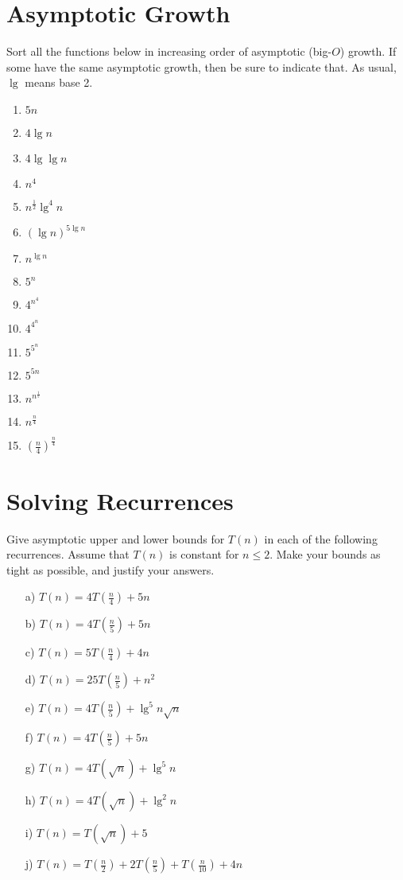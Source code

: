 \documentclass[11pt]{article}
\begin{document}
\section{Asymptotic Growth}\label{sec:asymptotic}
Sort all the functions below in increasing order of asymptotic (big-$O$) growth. If some have the
same asymptotic growth, then be sure to indicate that. As usual, $\lg$ means base 2.

\begin{enumerate}
    \item $5n$
    \item $4 \lg n$
    \item $4 \lg \lg n$
    \item $n^4$
    \item $n^{\frac{1}{2}} \lg^4 n$
    \item $(\lg n)^{5 \lg n}$
    \item $n^{\lg n}$
    \item $5^n$
    \item $4^{n^4}$
    \item $4^{4^n}$
    \item $5^{5^n}$
    \item $5^{5n}$
    \item $n^{n^{\frac{1}{5}}}$
    \item $n^{\frac{n}{4}}$
    \item $(\frac{n}{4})^{\frac{n}{4}}$
\end{enumerate}

\section{Solving Recurrences}\label{sec:recurrences}
Give asymptotic upper and lower bounds for $T(n)$ in each of the following recurrences. Assume
that $T(n)$ is constant for $n \leq 2$. Make your bounds as tight as possible, and justify your answers.

\begin{enumerate}
    \item[a)] $T(n) = 4T(\frac{n}{4}) + 5n$
    \item[b)] $T(n) = 4T(\frac{n}{5}) + 5n$
    \item[c)] $T(n) = 5T(\frac{n}{4}) + 4n$
    \item[d)] $T(n) = 25T(\frac{n}{5}) + n^2$
    \item[e)] $T(n) = 4T(\frac{n}{5}) + \lg^5 n \sqrt{n}$
    \item[f)] $T(n) = 4T(\frac{n}{5}) + 5n$
    \item[g)] $T(n) = 4T(\sqrt{n}) + \lg^5 n$
    \item[h)] $T(n) = 4T(\sqrt{n}) + \lg^2 n$
    \item[i)] $T(n) = T(\sqrt{n}) + 5$
    \item[j)] $T(n) = T(\frac{n}{2}) + 2T(\frac{n}{5}) + T(\frac{n}{10}) + 4n$
\end{enumerate}
\end{document}
